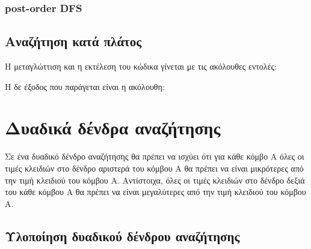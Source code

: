 \subsubsection{post-order DFS}

\subsection{Αναζήτηση κατά πλάτος}







Η μεταγλώττιση και η εκτέλεση του κώδικα γίνεται με τις ακόλουθες εντολές:

%

Η δε έξοδος που παράγεται είναι η ακόλουθη:

%


\section{Δυαδικά δένδρα αναζήτησης}

Σε ένα δυαδικό δένδρο αναζήτησης θα πρέπει να ισχύει ότι για κάθε κόμβο Α όλες οι τιμές κλειδιών στο δένδρο αριστερά του κόμβου Α θα πρέπει να είναι μικρότερες από την τιμή κλειδιού του κόμβου Α. Αντίστοιχα, όλες οι τιμές κλειδιών στο δένδρο δεξιά του κάθε κόμβου Α θα πρέπει να είναι μεγαλύτερες από την τιμή κλειδιού του κόμβου Α.

\subsection{Υλοποίηση δυαδικού δένδρου αναζήτησης}







